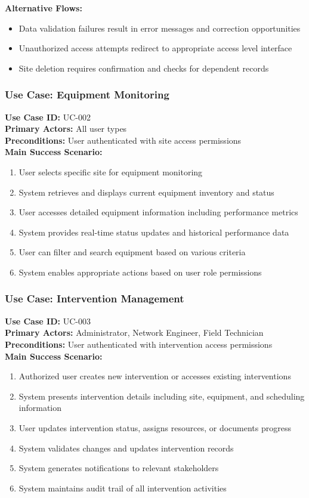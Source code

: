 \textbf{Alternative Flows:}
\begin{itemize}
\item Data validation failures result in error messages and correction opportunities
\item Unauthorized access attempts redirect to appropriate access level interface
\item Site deletion requires confirmation and checks for dependent records
\end{itemize}

\subsubsection{Use Case: Equipment Monitoring}
\textbf{Use Case ID:} UC-002 \\
\textbf{Primary Actors:} All user types \\
\textbf{Preconditions:} User authenticated with site access permissions \\

\textbf{Main Success Scenario:}
\begin{enumerate}
\item User selects specific site for equipment monitoring
\item System retrieves and displays current equipment inventory and status
\item User accesses detailed equipment information including performance metrics
\item System provides real-time status updates and historical performance data
\item User can filter and search equipment based on various criteria
\item System enables appropriate actions based on user role permissions
\end{enumerate}

\subsubsection{Use Case: Intervention Management}
\textbf{Use Case ID:} UC-003 \\
\textbf{Primary Actors:} Administrator, Network Engineer, Field Technician \\
\textbf{Preconditions:} User authenticated with intervention access permissions \\

\textbf{Main Success Scenario:}
\begin{enumerate}
\item Authorized user creates new intervention or accesses existing interventions
\item System presents intervention details including site, equipment, and scheduling information
\item User updates intervention status, assigns resources, or documents progress
\item System validates changes and updates intervention records
\item System generates notifications to relevant stakeholders
\item System maintains audit trail of all intervention activities
\end{enumerate}

